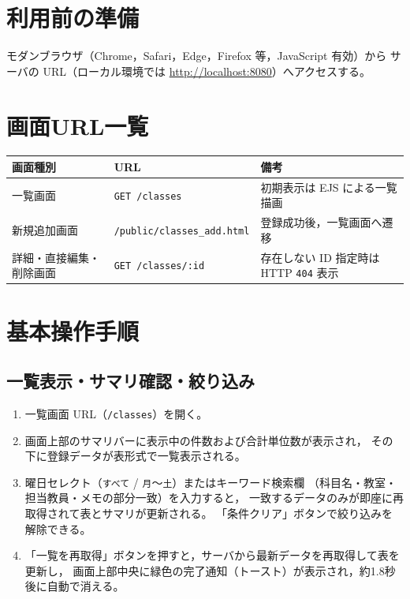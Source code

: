 \documentclass[
  a4paper,
  fontsize=11pt,
  line_length=40zw,
  number_of_lines=35,
  baselineskip=1.7zw
]{jlreq}
\begin{document}
\section{利用前の準備}

モダンブラウザ（Chrome，Safari，Edge，Firefox 等，JavaScript 有効）から
サーバの URL（ローカル環境では \url{http://localhost:8080}）へアクセスする。

\section{画面URL一覧}

\begin{table}[htbp]
  \centering
  \small
  \begin{tabularx}{\textwidth}{llX}
    \toprule
    画面種別 & URL & 備考 \\
    \midrule
    一覧画面 & \texttt{GET /classes} & 初期表示は EJS による一覧描画 \\
    新規追加画面 & \texttt{/public/classes\_add.html} & 登録成功後，一覧画面へ遷移 \\
    詳細・直接編集・削除画面 & \texttt{GET /classes/:id} & 存在しない ID 指定時は HTTP \texttt{404} 表示 \\
    \bottomrule
  \end{tabularx}
\end{table}

\section{基本操作手順}

\subsection{一覧表示・サマリ確認・絞り込み}
\begin{enumerate}
  \item 一覧画面 URL（\texttt{/classes}）を開く。
  \item 画面上部のサマリバーに表示中の件数および合計単位数が表示され，
    その下に登録データが表形式で一覧表示される。
  \item 曜日セレクト（\texttt{すべて} / \texttt{月}〜\texttt{土}）またはキーワード検索欄
    （科目名・教室・担当教員・メモの部分一致）を入力すると，
    一致するデータのみが即座に再取得されて表とサマリが更新される。
    「条件クリア」ボタンで絞り込みを解除できる。
  \item 「一覧を再取得」ボタンを押すと，サーバから最新データを再取得して表を更新し，
    画面上部中央に緑色の完了通知（トースト）が表示され，約1.8秒後に自動で消える。
\end{enumerate}
\end{document}
